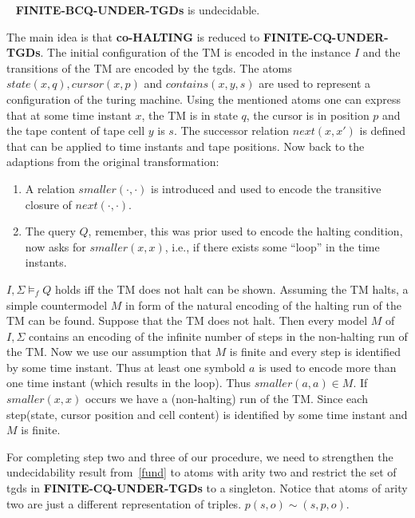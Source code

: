 \begin{theorem}\label{fund}~\cite{pichler2014containment}
	\textbf{FINITE-BCQ-UNDER-TGDs} is undecidable.
\end{theorem}
\begin{proofidea}
	The main idea is that \textbf{co-HALTING} is reduced to
	\textbf{FINITE-CQ-UNDER-TGDs}. 
	The initial configuration of the TM is encoded in the instance $I$ and the
	transitions of the TM are encoded by the tgds. 
	The atoms $state(x,q), cursor(x,p)$ and $contains(x,y,s)$ are used to
	represent a configuration of the turing machine. Using the mentioned atoms one can
	express that at some time instant $x$, the TM is in state $q$, the cursor is
	in position $p$ and the tape content of tape cell $y$ is $s$.
	The successor relation $next(x,x')$ is defined that can be applied to time
	instants and tape positions.
	Now back to the adaptions from the original transformation:
	\begin{enumerate}
		\item A relation $smaller(\cdot,\cdot)$ is introduced and
		used to encode the transitive closure of $next(\cdot,\cdot)$.
	\item The query $Q$, remember, this was prior used to encode the halting
			condition, now asks for $smaller(x,x)$, i.e., if there exists some
		``loop'' in the time instants.  
	\end{enumerate}
	$I,\Sigma \models_f Q$ holds iff the TM does not halt can be shown.
	Assuming the TM halts, a simple countermodel $M$ in form of the natural encoding
	of the halting run of the TM can be found.
	Suppose that the TM does not halt. Then every model $M$ of $I,\Sigma$
	contains an encoding of the infinite number of steps in the non-halting run
	of the TM. Now we use our assumption that $M$ is finite and every step is
	identified by some time instant. Thus at least one symbold $a$ is used to
	encode more than one time instant (which results in the loop). Thus
	$smaller(a,a) \in M$. If $smaller(x,x)$ occurs we have a (non-halting) run of the TM. 
	Since each step(state, cursor position and cell content) is identified by
	some time instant and $M$ is finite. 
\end{proofidea}

For completing step two and three of our procedure, we need to strengthen the
undecidability result from~\ref{fund} to atoms with arity two and restrict
the set of tgds in \textbf{FINITE-CQ-UNDER-TGDs} to a singleton. 
Notice that atoms of arity two are just a different representation of triples. 
$p(s,o) \sim (s,p,o)$.

